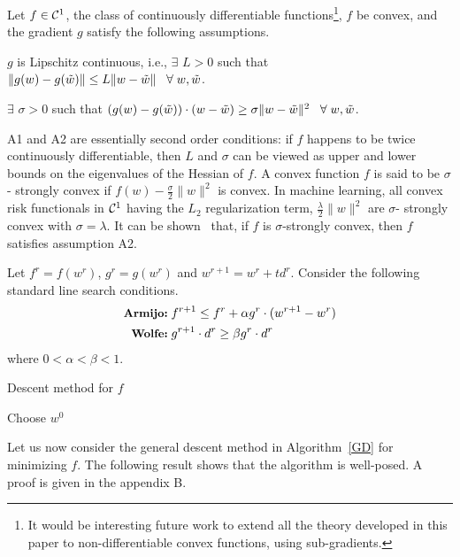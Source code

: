 \documentclass[twoside, 11pt]{article}
\begin{document}
Let $f\in{\cal{C}}^1$, the class of continuously differentiable functions\footnote{It would be interesting future work to extend all the theory developed in this paper to non-differentiable convex functions, using sub-gradients.}, $f$ be convex, and the gradient $g$ satisfy the following assumptions.

 $g$ is Lipschitz continuous, i.e., $\exists$ $L>0$ such that
$\|g(w)-g(\tilde{w})\| \le L \|w-\tilde{w}\| \;\;\; \forall \; w, \tilde{w}$.


 $\exists$ $\sigma >0$ such that
$(g(w)-g(\tilde{w}))\cdot(w-\tilde{w}) \ge \sigma \|w-\tilde{w}\|^2  \;\;\; \forall \; w, \tilde{w}$.

A1 and A2 are essentially second order conditions: if $f$ happens to be twice continuously differentiable, then $L$ and $\sigma$ can be viewed as upper and lower bounds on the eigenvalues of the Hessian of $f$. A convex function $f$ is said to be $\sigma$- strongly convex if $f(w)-\frac{\sigma}{2} \|w\|^2$ is convex. In machine learning, all convex risk functionals in ${\cal{C}}^1$ having the $L_2$ regularization term, $\frac{\lambda}{2} \|w\|^2$ are $\sigma$- strongly convex with $\sigma=\lambda$. It can be shown~\citep{smola2008}
that, if $f$ is $\sigma$-strongly convex, then $f$ satisfies assumption A2.

Let $f^r=f(w^r)$, $g^r=g(w^r)$ and $w^{r+1}=w^r+t d^r$. Consider the following standard line search conditions.
\begin{eqnarray}
\mbox{{\small\bf Armijo:}}\; & f^{r+1} \le f^r + \alpha g^r\cdot(w^{r+1}-w^r) \label{ag} \\
\mbox{{\small\bf Wolfe:}}\;  & g^{r+1}\cdot d^r \ge \beta g^r\cdot d^r \label{wolfe}
\end{eqnarray}
where $0<\alpha<\beta<1$.

\begin{algorithm2e}
\caption{Descent method for $f$\label{GD}}
Choose $w^0$\;
\end{algorithm2e}
Let us now consider the general descent method in Algorithm~\ref{GD} for minimizing $f$. The following result shows that the algorithm is well-posed. A proof is given in the appendix B.

\end{document}

